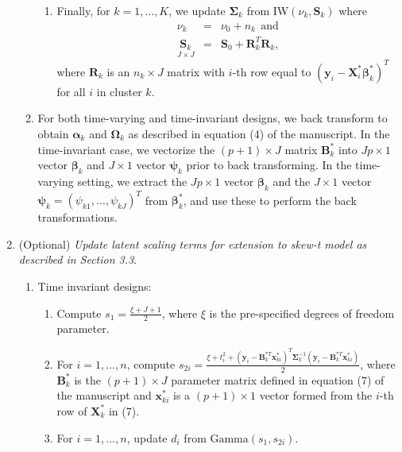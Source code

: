 \documentclass[useAMS,11pt]{article}
\newcommand{\1}{\mathbbm{1}}
\begin{document}
\begin{enumerate}
\begin{enumerate}
\begin{enumerate}
          \item Finally, for $k=1,\ldots,K$, we update $\boldsymbol\Sigma_k$ from IW$(\nu_k,\mathbf{S}_k)$ where
               \begin{eqnarray*}
                \nu_k&=&\nu_0+n_k ~~\text{and}\\
                \underset{J\times J}{\mathbf{S}_k}&=&\mathbf{S}_0+\mathbf{R}_k^T\mathbf{R}_k,
                \end{eqnarray*}
           where $\mathbf{R}_k$ is an $n_k \times J$ matrix with $i$-th row equal to $(\mathbf{y}_i-\mathbf{X}^*_i\boldsymbol\beta^*_k)^T$ for all $i$ in cluster $k$.
          \end{enumerate}

     \item  For both time-varying and time-invariant designs, we back transform to obtain $\boldsymbol\alpha_k$ and $\boldsymbol\Omega_k$ as described in equation (4) of the manuscript. In the time-invariant case, we
            vectorize the $(p+1)\times J$ matrix $\mathbf{B}^*_k$ into $Jp \times 1$ vector $\boldsymbol\beta_k$ and $J\times 1$ vector $\boldsymbol\psi_k$ prior to back transforming. In the time-varying setting, we extract the $Jp\times 1$ vector $\boldsymbol\beta_k$ and the $J\times 1 $ vector $\boldsymbol\psi_k=(\psi_{k1},\ldots,\psi_{kJ})^T$ from $\boldsymbol\beta^*_k$, and use these to perform the back transformations.
   \end{enumerate}
	\item (Optional) \textit{Update latent scaling terms for extension to skew-t model as described in Section 3.3}.
	\begin{enumerate}
        \item Time invariant designs:
        \begin{enumerate}
		\item Compute $s_1 = \frac{\xi + J + 1}{2}$, where $\xi$ is the pre-specified degrees of freedom parameter.\vspace{2pt}
		\item For $i = 1,...,n$, compute $s_{2i} = \frac{\xi + t_i^2 + (\mathbf{y}_i - \mathbf{B}^{*T}_k\mathbf{x}_{ki}^* )^T\boldsymbol\Sigma_k^{-1}(\mathbf{y}_i -  \mathbf{B}^{*T}_k\mathbf{x}_{ki}^* )}{2}$, where
              $\mathbf{B}^*_k$ is the $(p+1)\times J$ parameter matrix defined in equation (7) of the manuscript and $\mathbf{x}_{ki}^*$ is a $(p+1)\times 1$ vector formed from the $i$-th row of $\mathbf{X}^*_k$ in (7).\vspace{2pt}
		\item For $i = 1,...,n$, update $d_{i}$ from $\text{Gamma}(s_1,s_{2i})$.\vspace{2pt}

\end{enumerate}
\end{enumerate}
\end{enumerate}
\end{document}
